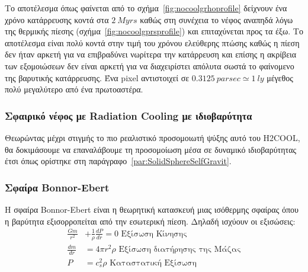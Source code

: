 \documentclass[article,a4paper,11.2pt]{memoir}
\numberwithin{equation}{subsection}
\begin{document}
Το αποτέλεσμα όπως φαίνεται από το σχήμα~\ref{fig:nocoolgrhoprofile} δείχνουν ένα χρόνο κατάρρευσης κοντά στα $\SI{2}{Myrs}$ καθώς στη συνέχεια το νέφος αναπηδά λόγω της θερμικής πίεσης (σχήμα~\ref{fig:nocoolgprsprofile}) και επιταχύνεται προς τα έξω.
Το αποτέλεσμα είναι πολύ κοντά στην τιμή του χρόνου ελεύθερης πτώσης καθώς η πίεση δεν ήταν αρκετή για να επιβραδύνει νωρίτερα την κατάρρευση και επίσης η ακρίβεια των εξομοιώσεων δεν είναι αρκετή για να διαχειρίστει απόλυτα σωστά το φαίνομενο της βαρυτικής κατάρρευσης. Ένα pixel αντιστοιχεί σε $\SI{0.3125}{parsec}\simeq \SI{1}{ly}$ μέγεθος πολύ μεγαλύτερο από ένα πρωτοαστέρα.

\subsubsection{Σφαιρικό νέφος με Radiation Cooling με ιδιοβαρύτητα}

Θεωρώντας μέχρι στιγμής το πιο ρεαλιστικό προσομοιωτή ψύξης αυτό του H2COOL, θα δοκιμάσουμε να επαναλάβουμε τη προσομοίωση μέσα σε δυναμικό ιδιοβαρύτητας έτσι όπως ορίστηκε στη παράγραφο~\ref{par:SolidSphereSelfGravit}. 
%
%	
%	
	
	\subsubsection{Σφαίρα Bonnor-Ebert}
	Η σφαίρα Bonnor-Ebert είναι η θεωρητική κατασκευή μιας ισόθερμης σφαίρας όπου η βαρύτητα εξισορροπείται από την εσωτερική πίεση. Δηλαδή ισχύουν οι εξισώσεις:
	\begin{align}
	\frac{Gm}{r^2} &+\frac{1}{\rho}\frac{dP}{dr}=0 \text{ Εξίσωση Κίνησης}\\
	\frac{dm}{dr} &= 4 \pi r^2 \rho \text{ Εξίσωση διατήρησης της Μάζας}\\
	P &= c_s ^2 \rho \text{ Καταστατική Εξίσωση}
	\end{align}
	
\end{document}
